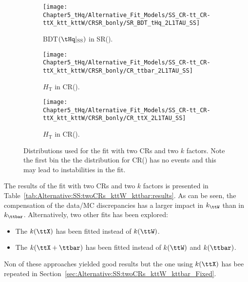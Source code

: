 \begin{figure}[h]
  \centering  
  \begin{subfigure}[b]{0.49\textwidth}
    \centering
    \texttt{[image: Chapter5\_tHq/Alternative\_Fit\_Models/SS\_CR-tt\_CR-ttX\_ktt\_kttW/CRSR\_bonly/SR\_BDT\_tHq\_2L1TAU\_SS]}
    \caption{BDT$(\tHq|_{\text{SS}})$ in SR(\tHq).}
     \label{fig:ChaptH:Alternative:SS:twoCRs_kttW_kttbar:Distributions:thq}
  \end{subfigure}
  \hfill
  \begin{subfigure}[b]{0.49\textwidth}
    \centering
    \texttt{[image: Chapter5\_tHq/Alternative\_Fit\_Models/SS\_CR-tt\_CR-ttX\_ktt\_kttW/CRSR\_bonly/CR\_ttbar\_2L1TAU\_SS]}
    \caption{$H_{\text{T}}$ in CR(\ttbar).}
     \label{fig:Alternative:SS:twoCRs_kttW_kttbar:Distributions:ttbar}
  \end{subfigure}
    \hfill
  \begin{subfigure}[b]{0.49\textwidth}
    \centering
    \texttt{[image: Chapter5\_tHq/Alternative\_Fit\_Models/SS\_CR-tt\_CR-ttX\_ktt\_kttW/CRSR\_bonly/CR\_ttX\_2L1TAU\_SS]}
    \caption{$H_{\text{T}}$ in CR(\ttX).}
     \label{fig:Alternative:SS:twoCRs_kttW_kttbar:Distributions:ttX}
  \end{subfigure}
  \caption{Distributions used for the \dilepSStau fit with two CRs and two $k$ factors. Note the first bin the the distribution for CR(\ttbar) has no events 
  and this may lead to instabilities in the fit.} 
  \label{fig:Alternative:SS:twoCRs_kttW_kttbar:Distributions}
\end{figure}

The results of the fit with two CRs and two $k$ factors is presented in Table~\ref{tab:Alternative:SS:twoCRs_kttW_kttbar:results}.
As can be seen, the compensation of the data/MC discrepancies has a larger impact in $k_{\ttW}$ than in $k_{\ttbar}$.
Alternatively, two other fits has been explored: 
\begin{itemize}
	\item The $k(\ttX)$ has been fitted instead of $k(\ttW)$. 
	\item The $k(\ttX + \ttbar)$ has been fitted instead of $k(\ttW)$ and $k(\ttbar)$. 
\end{itemize}
Non of these approaches yielded good results but the one using $k(\ttX)$ has bee
repeated in Section~\ref{sec:Alternative:SS:twoCRs_kttW_kttbar_Fixed}.

